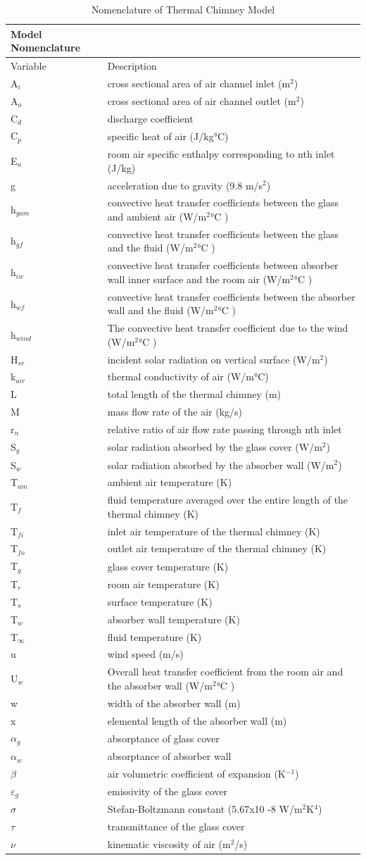 \begin{longtable}[l]{p{1.5in}p{4.5in}}
\caption{Nomenclature of Thermal Chimney Model \protect \label{table:nomenclature-of-thermal-chimney-model}}\\
\toprule 
Model Nomenclature \tabularnewline \midrule
\endhead
Variable & Description \tabularnewline
A\(_{i}\) & cross sectional area of air channel inlet (m\(^{2}\)) \tabularnewline
A\(_{o}\) & cross sectional area of air channel outlet (m\(^{2}\)) \tabularnewline
C\(_{d}\) & discharge coefficient \tabularnewline
C\(_{p}\) & specific heat of air (J/kg°C) \tabularnewline
E\(_{n}\) & room air specific enthalpy corresponding to nth inlet (J/kg) \tabularnewline
g & acceleration due to gravity (9.8 m/s\(^{2}\)) \tabularnewline
h\(_{gam}\) & convective heat transfer coefficients between the glass and ambient air (W/m\(^{2}\)°C ) \tabularnewline
h\(_{gf}\) & convective heat transfer coefficients between the glass and the fluid (W/m\(^{2}\)°C ) \tabularnewline
h\(_{iw}\) & convective heat transfer coefficients between absorber wall inner surface and the room air (W/m\(^{2}\)°C ) \tabularnewline
h\(_{wf}\) & convective heat transfer coefficients between the absorber wall and the fluid (W/m\(^{2}\)°C ) \tabularnewline
h\(_{wind}\) & The convective heat transfer coefficient due to the wind (W/m\(^{2}\)°C ) \tabularnewline
H\(_{sr}\) & incident solar radiation on vertical surface (W/m\(^{2}\)) \tabularnewline
k\(_{air}\) & thermal conductivity of air (W/m°C) \tabularnewline
L & total length of the thermal chimney (m) \tabularnewline
M & mass flow rate of the air (kg/s) \tabularnewline
r\(_{n}\) & relative ratio of air flow rate passing through nth inlet \tabularnewline
S\(_{g}\) & solar radiation absorbed by the glass cover (W/m\(^{2}\)) \tabularnewline
S\(_{w}\) & solar radiation absorbed by the absorber wall (W/m\(^{2}\)) \tabularnewline
T\(_{am}\) & ambient air temperature (K) \tabularnewline
T\(_{f}\) & fluid temperature averaged over the entire length of the thermal chimney (K) \tabularnewline
T\(_{fi}\) & inlet air temperature of the thermal chimney (K) \tabularnewline
T\(_{fo}\) & outlet air temperature of the thermal chimney (K) \tabularnewline
T\(_{g}\) & glass cover temperature (K) \tabularnewline
T\(_{r}\) & room air temperature (K) \tabularnewline
T\(_{s}\) & surface temperature (K) \tabularnewline
T\(_{w}\) & absorber wall temperature (K) \tabularnewline
T\(_{\infty}\) & fluid temperature (K) \tabularnewline
u & wind speed (m/s) \tabularnewline
U\(_{w}\) & Overall heat transfer coefficient from the room air and the absorber wall (W/m\(^{2}\)°C ) \tabularnewline
w & width of the absorber wall (m) \tabularnewline
x & elemental length of the absorber wall (m) \tabularnewline
$\alpha$\(_{g}\) & absorptance of glass cover \tabularnewline
$\alpha$\(_{w}\) & absorptance of absorber wall \tabularnewline
$\beta$ & air volumetric coefficient of expansion (K\(^{-1}\)) \tabularnewline
$\varepsilon$\(_{g}\) & emissivity of the glass cover \tabularnewline
$\sigma$ & Stefan-Boltzmann constant (5.67x10 -8 W/m\(^{2}\)K\(^{4}\)) \tabularnewline
$\tau$ & transmittance of the glass cover \tabularnewline
$\nu$ & kinematic viscosity of air (m\(^{2}\)/s) \tabularnewline
\bottomrule
\end{longtable}

